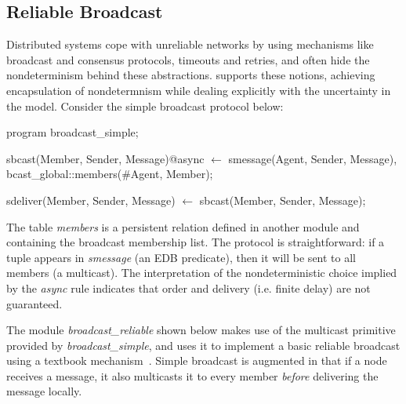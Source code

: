 \subsection{Reliable Broadcast}
Distributed systems cope with unreliable networks by using mechanisms like broadcast and consensus protocols, 
timeouts and retries, and often hide the nondeterminism behind these abstractions.  \lang supports these notions,
achieving encapsulation of nondetermnism while dealing explicitly with the uncertainty in the model.  Consider the simple
broadcast protocol below:


\begin{Dedalus}

program broadcast_simple;

sbcast(Member, Sender, Message)@async \(\leftarrow\)
    smessage(Agent, Sender, Message),
    bcast_global::members(#Agent, Member);

sdeliver(Member, Sender, Message) \(\leftarrow\)
    sbcast(Member, Sender, Message);

\end{Dedalus}

The table \emph{members} is a persistent relation defined in another module  and containing the broadcast 
membership list.  
The protocol is straightforward: if a tuple appears in \emph{smessage} (an EDB predicate), then
it will be sent to all members (a multicast).  The interpretation of the nondeterministic choice implied by the
\emph{async} rule indicates that order and delivery (i.e. finite delay) are not guaranteed.

The module \emph{broadcast\_reliable} shown below makes use of the multicast primitive provided by \emph{broadcast\_simple}, and
uses it to implement a basic reliable broadcast using a textbook mechanism~\cite{mullender}. 
Simple broadcast is augmented in that if a node receives a message, it 
also multicasts it to every member \emph{before} delivering the message locally.  



